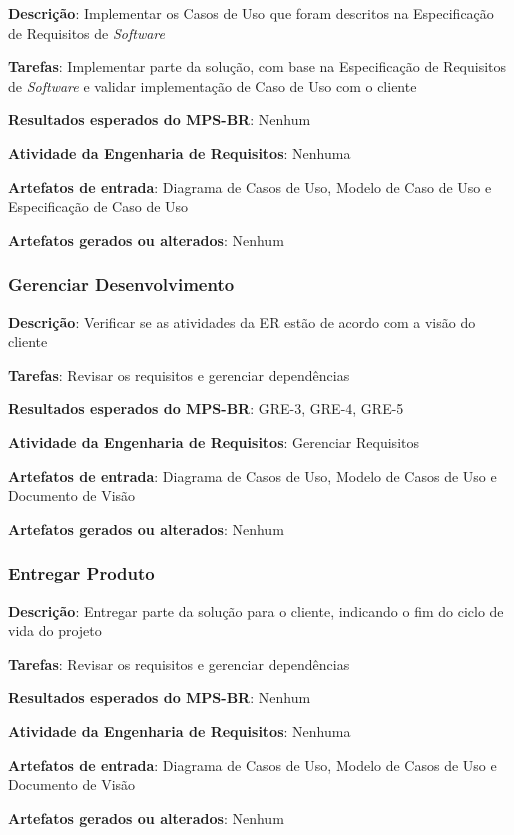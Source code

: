 \begin{description}
\item\textbf{Descrição}: Implementar os Casos de Uso que foram descritos na Especificação de Requisitos de \textit{Software}
\item\textbf{Tarefas}: Implementar parte da solução, com base na Especificação de Requisitos de \textit{Software} e validar implementação de Caso de Uso com o cliente
\item\textbf{Resultados esperados do MPS-BR}: Nenhum
\item\textbf{Atividade da Engenharia de Requisitos}: Nenhuma
\item\textbf{Artefatos de entrada}: Diagrama de Casos de Uso, Modelo de Caso de Uso e Especificação de Caso de Uso
\item\textbf{Artefatos gerados ou alterados}: Nenhum
\end{description}

\subsubsection{Gerenciar Desenvolvimento}

\begin{description}
\item\textbf{Descrição}: Verificar se as atividades da ER estão de acordo com a visão do cliente
\item\textbf{Tarefas}: Revisar os requisitos e gerenciar dependências
\item\textbf{Resultados esperados do MPS-BR}: GRE-3, GRE-4, GRE-5
\item\textbf{Atividade da Engenharia de Requisitos}: Gerenciar Requisitos
\item\textbf{Artefatos de entrada}: Diagrama de Casos de Uso, Modelo de Casos de Uso e Documento de Visão
\item\textbf{Artefatos gerados ou alterados}: Nenhum
\end{description}

\subsubsection{Entregar Produto}

\begin{description}
\item\textbf{Descrição}: Entregar parte da solução para o cliente, indicando o fim do ciclo de vida do projeto
\item\textbf{Tarefas}: Revisar os requisitos e gerenciar dependências
\item\textbf{Resultados esperados do MPS-BR}: Nenhum
\item\textbf{Atividade da Engenharia de Requisitos}: Nenhuma
\item\textbf{Artefatos de entrada}: Diagrama de Casos de Uso, Modelo de Casos de Uso e Documento de Visão
\item\textbf{Artefatos gerados ou alterados}: Nenhum
\end{description}

